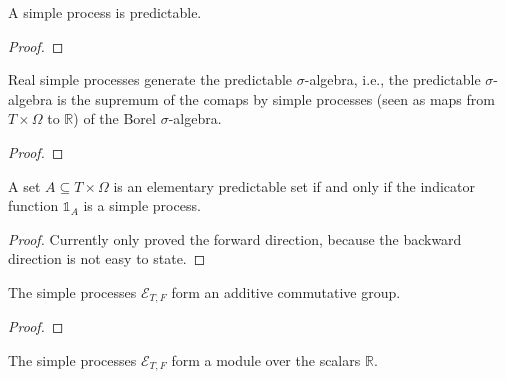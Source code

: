 \begin{lemma}\label{lem:predictable_simpleProcess}
  \leanok
A simple process is predictable.
\end{lemma}

\begin{proof}
  \leanok
\end{proof}


\begin{lemma}\label{lem:iSup_comap_simpleProcess}
  \leanok
Real simple processes generate the predictable $\sigma$-algebra, i.e., the predictable $\sigma$-algebra is the supremum of the comaps by simple processes (seen as maps from $T \times \Omega$ to $\mathbb{R}$) of the Borel $\sigma$-algebra.
\end{lemma}

\begin{proof}
  \leanok
\end{proof}


\begin{lemma}\label{lem:elementaryPredictableSet_iff_indicator}
  \leanok
A set $A \subseteq T \times \Omega$ is an elementary predictable set if and only if the indicator function $\mathbb{1}_A$ is a simple process.
\end{lemma}

\begin{proof}

\leanok
  Currently only proved the forward direction, because the backward direction is not easy to state.
\end{proof}


\begin{lemma}\label{lem:addCommGroup_simpleProcess}
  \leanok
The simple processes $\mathcal{E}_{T, F}$ form an additive commutative group.
\end{lemma}

\begin{proof}
  \leanok
\end{proof}


\begin{lemma}\label{lem:module_simpleProcess}
  \leanok
The simple processes $\mathcal{E}_{T, F}$ form a module over the scalars $\mathbb{R}$.
\end{lemma}

